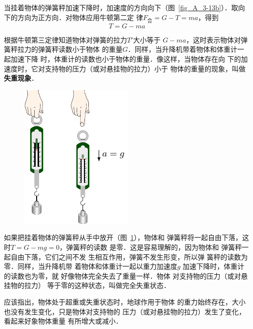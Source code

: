     当挂着物体的弹簧秤加速下降时，加速度的方向向下（图~\ref{fig_A_3-13b}）．取向下的方向为正方向．对物体应用牛顿第二定
律$F_{\text{合}}=G-T=ma$，得到
                               \[T=G-ma\]
    
根据牛顿第三定律知道物体对弹簧的拉力$T'$大小等于
$G-ma$，这时表示物体对弹簧秤拉力的弹簧秤读数小于物体
的重量$G$．同样，当升降机带着物体和体重计一起加速下降
时，体重计的读数也小于物体的重量．像这样，当物体存在向
下的加速度时，它对支持物的压力（或对悬挂物的拉力）小于
物体的重量的现象，叫做\textbf{失重现象}．

\begin{figure}[htp]
    \centering
    \includegraphics{fig/A/3-14.pdf}
    \caption{}\label{fig_A_3-14}
\end{figure}

    如果把挂着物体的弹簧秤从手中放开（图~\ref{fig_A_3-14}），物体和
弹簧秤将一起自由下落，这时$T=G-mg=0$，弹簧秤的读数
是零．这是容易理解的，因为物体和
弹簧秤一起自由下落，它们之间不发
生相互作用，弹簧不发生形变，所以弹
簧秤的读数为零．同样，当升降机带
着物体和体重计一起以重力加速度$g$
加速下降时，体重计的读数也为零，就
好像物体完全失去了重量一样．物体
对支持物的压力（或对悬挂物的拉力）
等于零的这种状态，叫做完全失重状态．

    应该指出，物体处于超重或失重状态时，地球作用于物体
的重力始终存在，大小也没有发生变化，只是物体对支持物的
压力（或对悬挂物的拉力）发生了变化，看起来好象物体重量
有所增大或减小．


